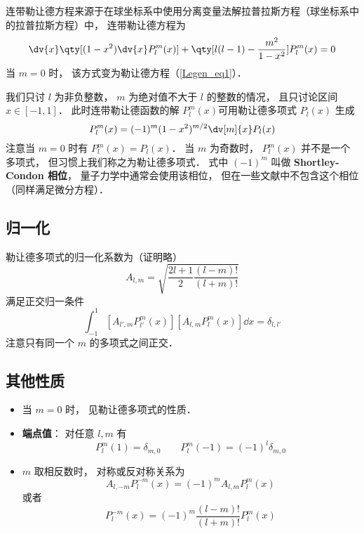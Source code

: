 

连带勒让德方程来源于在球坐标系中使用分离变量法解拉普拉斯方程（球坐标系中的拉普拉斯方程）中， 连带勒让德方程为
\begin{equation}\label{AsLgdr_eq2}
\dv{x} \qty[(1-x^2)\dv{x} P_l^m(x)] + \qty[l(l-1) - \frac{m^2}{1-x^2}]P_l^m(x) = 0
\end{equation}
当 $m = 0$ 时， 该方式变为勒让德方程（\autoref{Legen_eq1}）．

我们只讨 $l$ 为非负整数， $m$ 为绝对值不大于 $l$ 的整数的情况， 且只讨论区间 $x\in [-1,1]$． 此时连带勒让德函数的解 $P_l^m(x)$可用勒让德多项式 $P_l(x)$ 生成
\begin{equation}\label{AsLgdr_eq1}
P_l^m(x) = (-1)^m (1 - x^2)^{m/2} \dv[m]{x} P_l(x)
\end{equation}
注意当 $m = 0$ 时有 $P_l^m(x) = P_l(x)$． 当 $m$ 为奇数时， $P_l^m(x)$ 并不是一个多项式， 但习惯上我们称之为勒让德多项式． 式中 $(-1)^m$ 叫做 \textbf{Shortley-Condon 相位}， 量子力学中通常会使用该相位， 但在一些文献中不包含这个相位（同样满足微分方程）．

\subsection{归一化}
勒让德多项式的归一化系数为（证明略）
\begin{equation}\label{AsLgdr_eq3}
A_{l,m} = \sqrt{\frac{2l+1}{2}\frac{(l-m)!}{(l+m)!}}
\end{equation}
满足正交归一条件
\begin{equation}\label{AsLgdr_eq4}
\int_{-1}^1 [A_{l',m} P_{l'}^{m}(x)] [A_{l,m} P_l^{m}(x)] \dd{x} = \delta_{l,l'}
\end{equation}
注意只有同一个 $m$ 的多项式之间正交．

\subsection{其他性质}
\begin{itemize}
\item 当 $m = 0$ 时， 见勒让德多项式的性质．

\item \textbf{端点值}： 对任意 $l, m$ 有
\begin{equation}
P_l^m(1) = \delta_{m, 0}
\qquad
P_l^m(-1) = (-1)^l \delta_{m, 0}
\end{equation}

\item $m$ 取相反数时， 对称或反对称关系为
\begin{equation}
A_{l,-m} P_l^{-m}(x) = (-1)^m A_{l,m} P_l^m(x)
\end{equation}
或者
\begin{equation}
P_l^{-m}(x) = (-1)^m \frac{(l-m)!}{(l+m)!} P_l^m(x)
\end{equation}
\end{itemize}
